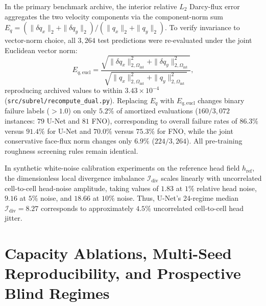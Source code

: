 \documentclass[preprint,12pt,authoryear]{elsarticle}
\begin{document}
In the primary benchmark archive, the interior relative $L_2$ Darcy-flux error aggregates the two velocity components via the component-norm sum $E_q = (\|\delta q_x\|_2 + \|\delta q_y\|_2) / (\|q_x\|_2 + \|q_y\|_2)$. To verify invariance to vector-norm choice, all $3{,}264$ test predictions were re-evaluated under the joint Euclidean vector norm:
\begin{equation}
  E_{q,\text{eucl}} = \frac{\sqrt{\|\delta q_x\|_{2,\Omega_{\text{int}}}^2 + \|\delta q_y\|_{2,\Omega_{\text{int}}}^2}}{\sqrt{\|q_x\|_{2,\Omega_{\text{int}}}^2 + \|q_y\|_{2,\Omega_{\text{int}}}^2}},
\end{equation}
reproducing archived values to within $3.43 \times 10^{-4}$ (\texttt{src/subrel/recompute\_dual.py}). Replacing $E_q$ with $E_{q,\text{eucl}}$ changes binary failure labels ($> 1.0$) on only $5.2\%$ of amortized evaluations ($160 / 3{,}072$ instances: $79$ U-Net and $81$ FNO), corresponding to overall failure rates of $86.3\%$ versus $91.4\%$ for U-Net and $70.0\%$ versus $75.3\%$ for FNO, while the joint conservative face-flux norm changes only $6.9\%$ ($224 / 3{,}264$). All pre-training roughness screening rules remain identical.

In synthetic white-noise calibration experiments on the reference head field $h_{\text{ref}}$, the dimensionless local divergence imbalance $\mathcal{I}_{\text{div}}$ scales linearly with uncorrelated cell-to-cell head-noise amplitude, taking values of $1.83$ at $1\%$ relative head noise, $9.16$ at $5\%$ noise, and $18.66$ at $10\%$ noise. Thus, U-Net's 24-regime median $\mathcal{I}_{\text{div}} = 8.27$ corresponds to approximately $4.5\%$ uncorrelated cell-to-cell head jitter.

\section{Capacity Ablations, Multi-Seed Reproducibility, and Prospective Blind Regimes}
\label{sec:s3}
\end{document}
